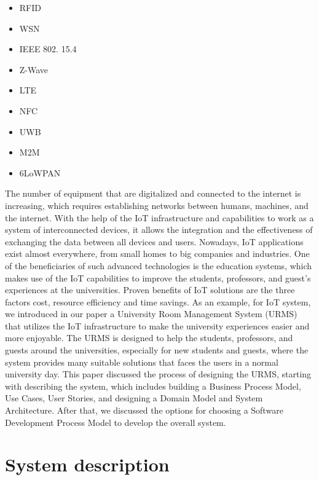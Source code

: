 \documentclass[conference,onecolumn]{IEEEtran}
\begin{document}
\begin{multicols}{2} %
	\begin{center}
		\begin{itemize}
			\item RFID
			\item WSN
			\item IEEE 802. 15.4
			\item Z-Wave
			\item LTE
			\item NFC
			\item UWB
			\item M2M
			\item 6LoWPAN	
		\end{itemize}
	\end{center}
\end{multicols}
	
The number of equipment that are digitalized and connected to the internet is increasing, which requires establishing networks between humans, machines, and the internet. With the help of the IoT infrastructure and capabilities to work as a system of interconnected devices, it allows the integration and the effectiveness of exchanging the data between all devices and users. Nowadays, IoT applications exist almost everywhere, from small homes to big companies and industries. One of the beneficiaries of such advanced technologies is the education systems, which makes use of the IoT capabilities to improve the students, professors, and guest’s experiences at the universities. Proven benefits of IoT solutions are the three factors cost, resource efficiency and time savings. As an example, for IoT system, we introduced in our paper a University Room Management System (URMS) that utilizes the IoT infrastructure to make the university experiences easier and more enjoyable. The URMS is designed to help the students, professors, and guests around the universities, especially for new students and guests, where the system provides many suitable solutions that faces the users in a normal university day. 
This paper discussed the process of designing the URMS, starting with describing the system, which includes building a Business Process Model, Use Cases, User Stories, and designing a Domain Model and System Architecture. After that, we discussed the options for choosing a Software Development Process Model to develop the overall system. 


\section{System description}
\end{document}
